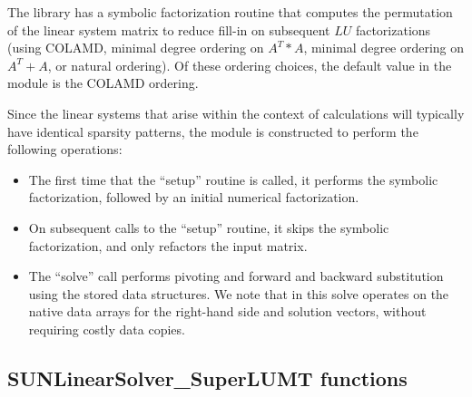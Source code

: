 The {\superlumt} library has a symbolic factorization routine that
computes the permutation of the linear system matrix to reduce fill-in
on subsequent $LU$ factorizations (using COLAMD, minimal degree
ordering on $A^T*A$, minimal degree ordering on $A^T+A$, or natural
ordering).  Of these ordering choices, the default value in the
{\sunlinsolslumt} module is the COLAMD ordering. 

Since the linear systems that arise within the context of {\sundials}
calculations will typically have identical sparsity patterns, the
{\sunlinsolslumt} module is constructed to perform the
following operations:
\begin{itemize}
\item The first time that the ``setup'' routine is called, it
  performs the symbolic factorization, followed by an initial
  numerical factorization.  
\item On subsequent calls to the ``setup'' routine, it skips the
  symbolic factorization, and only refactors the input matrix.
\item The ``solve'' call performs pivoting and forward and
  backward substitution using the stored {\superlumt} data
  structures.  We note that in this solve {\superlumt} operates on the
  native data arrays for the right-hand side and solution vectors,
  without requiring costly data copies.
\end{itemize}


\subsection{SUNLinearSolver\_SuperLUMT functions}
\label{ss:sunlinsol_slumt_functions}

